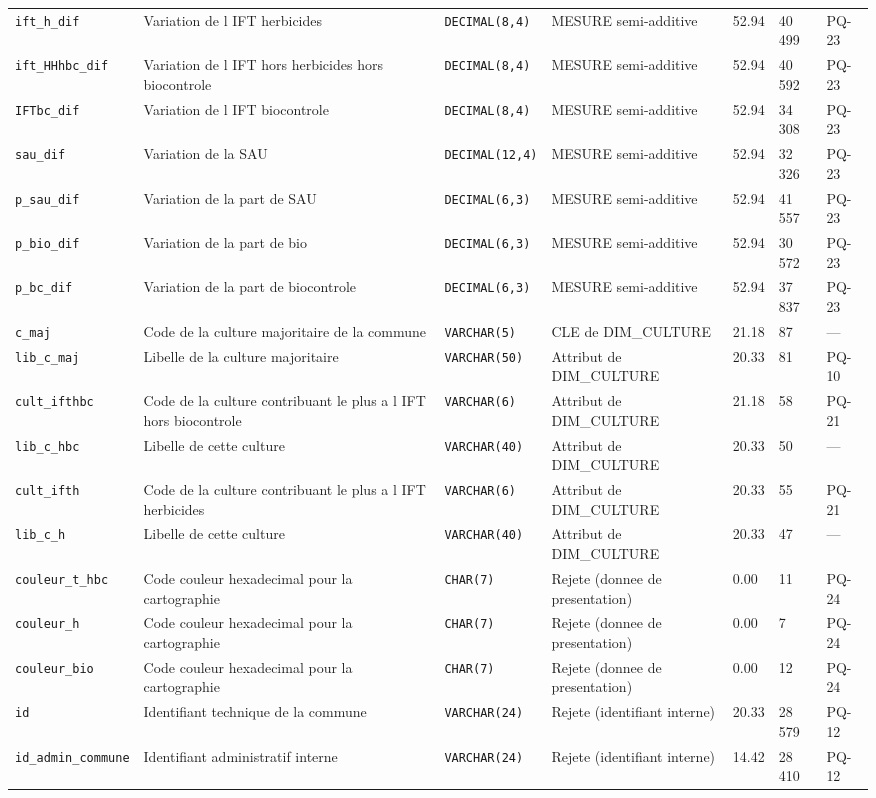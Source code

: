 {\begin{longtable}{@{}p{2.6cm}p{3.5cm}p{1.9cm}p{3.1cm}p{1.1cm}p{1.3cm}p{0.9cm}@{}}
\texttt{ift\_h\_dif} & Variation de l IFT herbicides & \texttt{DECIMAL(8,4)} & MESURE semi-additive & 52.94 & 40 499 & PQ-23 \\
\texttt{ift\_HHhbc\_dif} & Variation de l IFT hors herbicides hors biocontrole & \texttt{DECIMAL(8,4)} & MESURE semi-additive & 52.94 & 40 592 & PQ-23 \\
\texttt{IFTbc\_dif} & Variation de l IFT biocontrole & \texttt{DECIMAL(8,4)} & MESURE semi-additive & 52.94 & 34 308 & PQ-23 \\
\texttt{sau\_dif} & Variation de la SAU & \texttt{DECIMAL(12,4)} & MESURE semi-additive & 52.94 & 32 326 & PQ-23 \\
\texttt{p\_sau\_dif} & Variation de la part de SAU & \texttt{DECIMAL(6,3)} & MESURE semi-additive & 52.94 & 41 557 & PQ-23 \\
\texttt{p\_bio\_dif} & Variation de la part de bio & \texttt{DECIMAL(6,3)} & MESURE semi-additive & 52.94 & 30 572 & PQ-23 \\
\texttt{p\_bc\_dif} & Variation de la part de biocontrole & \texttt{DECIMAL(6,3)} & MESURE semi-additive & 52.94 & 37 837 & PQ-23 \\
\texttt{c\_maj} & Code de la culture majoritaire de la commune & \texttt{VARCHAR(5)} & CLE de DIM\_CULTURE & 21.18 & 87 & --- \\
\texttt{lib\_c\_maj} & Libelle de la culture majoritaire & \texttt{VARCHAR(50)} & Attribut de DIM\_CULTURE & 20.33 & 81 & PQ-10 \\
\texttt{cult\_ifthbc} & Code de la culture contribuant le plus a l IFT hors biocontrole & \texttt{VARCHAR(6)} & Attribut de DIM\_CULTURE & 21.18 & 58 & PQ-21 \\
\texttt{lib\_c\_hbc} & Libelle de cette culture & \texttt{VARCHAR(40)} & Attribut de DIM\_CULTURE & 20.33 & 50 & --- \\
\texttt{cult\_ifth} & Code de la culture contribuant le plus a l IFT herbicides & \texttt{VARCHAR(6)} & Attribut de DIM\_CULTURE & 20.33 & 55 & PQ-21 \\
\texttt{lib\_c\_h} & Libelle de cette culture & \texttt{VARCHAR(40)} & Attribut de DIM\_CULTURE & 20.33 & 47 & --- \\
\texttt{couleur\_t\_hbc} & Code couleur hexadecimal pour la cartographie & \texttt{CHAR(7)} & Rejete (donnee de presentation) & 0.00 & 11 & PQ-24 \\
\texttt{couleur\_h} & Code couleur hexadecimal pour la cartographie & \texttt{CHAR(7)} & Rejete (donnee de presentation) & 0.00 & 7 & PQ-24 \\
\texttt{couleur\_bio} & Code couleur hexadecimal pour la cartographie & \texttt{CHAR(7)} & Rejete (donnee de presentation) & 0.00 & 12 & PQ-24 \\
\texttt{id} & Identifiant technique de la commune & \texttt{VARCHAR(24)} & Rejete (identifiant interne) & 20.33 & 28 579 & PQ-12 \\
\texttt{id\_admin\_commune} & Identifiant administratif interne & \texttt{VARCHAR(24)} & Rejete (identifiant interne) & 14.42 & 28 410 & PQ-12 \\
\end{longtable}}

